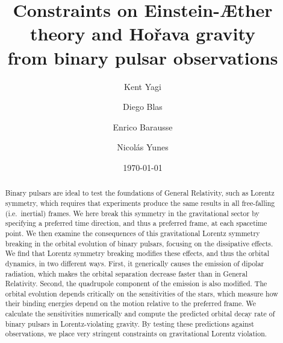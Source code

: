 \documentclass[prd,aps,twocolumn,nofootinbib,showpacs,superscriptaddress]{revtex4-1}
\begin{document}
\title{Constraints on Einstein-\AE ther theory and  Ho\v rava gravity \\ from binary pulsar observations}

\author{Kent Yagi}

\author{Diego Blas}

\author{Enrico Barausse}

\author{Nicol\'as Yunes}

\date{\today}

\begin{abstract} 
Binary pulsars are ideal to test the foundations of General Relativity, such as Lorentz symmetry, which
%
requires that experiments produce the same results in all free-falling (i.e.~inertial) frames. 
%
We here break this symmetry in the gravitational sector by specifying a preferred time direction, and thus a preferred frame, at each spacetime point. 
%
We then examine the consequences of this gravitational Lorentz symmetry breaking in the orbital evolution of binary pulsars,  focusing
on the dissipative effects. 
%
We find that Lorentz symmetry breaking modifies these effects, and thus the orbital dynamics, in two different ways.
First, it generically causes the emission of dipolar radiation, which makes the orbital separation decrease faster than in General Relativity. Second, the quadrupole component of the emission is also modified.
%
The orbital evolution depends critically on the sensitivities of the stars, which measure how their binding energies depend on the motion relative to the preferred frame. 
%
We calculate the sensitivities numerically and compute the predicted orbital decay rate of binary pulsars in Lorentz-violating gravity.  
%
By testing these predictions against  observations, we place very stringent constraints on gravitational Lorentz violation.

\end{abstract}

\end{document}
